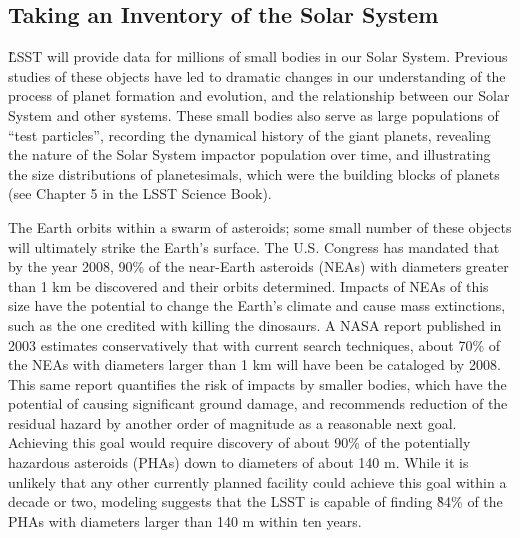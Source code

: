 \subsection{Taking an Inventory of the Solar System}

\G{LSST will provide data for millions of small bodies in our Solar System. Previous studies
of these objects have led to dramatic changes in our understanding of the process of
planet formation and evolution, and the relationship between our Solar System and other
systems. These small bodies also serve as large populations of ``test particles'', recording
the dynamical history of the giant planets, revealing the nature of the Solar System impactor
population over time, and illustrating the size distributions of planetesimals, which were the
building blocks of planets  (see Chapter 5 in the LSST Science Book).}

The Earth orbits within a swarm of asteroids; some small number of these
objects will ultimately strike the Earth's surface. The U.S. Congress has
mandated that by the year 2008, 90\% of the near-Earth asteroids (NEAs)
with diameters greater than 1 km be discovered and their orbits
determined. Impacts of NEAs of this size have the potential to change the
Earth's climate and cause mass extinctions, such as the one credited with
killing the dinosaurs. A NASA report published in 2003 estimates
conservatively that with current search techniques, about 70\% of the NEAs
with diameters larger than 1 km will have been be cataloged by 2008. This same report
quantifies the risk of impacts by smaller bodies, which have the potential
of causing significant ground damage, and recommends reduction of the residual
hazard by another order of magnitude  as a reasonable next
goal. Achieving this goal would require discovery of about 90\% of the
potentially hazardous asteroids (PHAs) down to diameters of about 140
m. While it is unlikely that any other currently planned facility could achieve
this goal within a decade or two, modeling suggests that the LSST is capable
of finding \G{84\%} of the PHAs with diameters larger than 140 m within
ten years.

